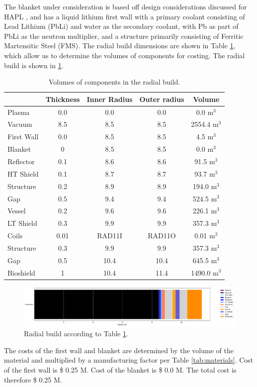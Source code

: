 The blanket under consideration is based off design considerations discussed for HAPL \cite{Raffray2006}, and has a liquid lithium first wall with a primary coolant consisting of Lead Lithium (PbLi) and water as the secondary coolant, with Pb as part of PbLi as the neutron multiplier, and a structure primarily consisting of Ferritic Martensitic Steel (FMS). The radial build dimensions are shown in Table \ref{tab:volumes}, which allow us to determine the volumes of components for costing.  The radial build is shown in \ref{fig:radial}.  \\


\begin{table}[h!]
    \centering
    \begin{tabular}{l c  c c c}
    \hline
        &	Thickness	&	Inner Radius	&	Outer radius	&	Volume		\\
        \hline
Plasma	&	0.0	&	0.0	&	0.0	&	0.0	m$^{3}$	\\
Vacuum	&	8.5	&	8.5	&	8.5	&	2554.4	m$^{3}$	\\
First Wall	&	0.0	&	8.5	&	8.5	&	4.5	m$^{3}$	\\
Blanket	&	0	&	8.5	&	8.5	&	0.0	m$^{3}$	\\
Reflector	&	0.1	&	8.6	&	8.6	&	91.5	m$^{3}$	\\
HT Shield	&	0.1	&	8.7	&	8.7	&	93.7	m$^{3}$	\\
Structure	&	0.2	&	8.9	&	8.9	&	194.0	m$^{3}$	\\
Gap	&	0.5	&	9.4	&	9.4	&	524.5	m$^{3}$	\\
Vessel	&	0.2	&	9.6	&	9.6	&	226.1	m$^{3}$	\\
LT Shield	&	0.3	&	9.9	&	9.9	&	357.3	m$^{3}$	\\
Coils	&	0.01	&	RAD11I	&	RAD11O	&	0.01	m$^{3}$	\\
Structure	&	0.3	&	9.9	&	9.9	&	357.3	m$^{3}$	\\
Gap	&	0.5	&	10.4	&	10.4	&	645.5	m$^{3}$	\\
Bioshield	&	1	&	10.4	&	11.4	&	1490.0	m$^{3}$	\\

        \hline
    \end{tabular}
    \caption{Volumes of components in the radial build.}
    \label{tab:volumes}
\end{table}

\begin{figure}
    \centering
    \includegraphics[width=0.9\linewidth]{Figures/radial_build.pdf}
    \caption{Radial build according to Table \ref{tab:volumes}.}
    \label{fig:radial}
\end{figure}



The costs of the first wall and blanket are determined by the volume of the material and multiplied by a manufacturing factor per Table \ref{tab:materials}.   Cost of the first wall is \$ 0.25 M.  Cost of the blanket is \$ 0.0 M. The total cost is therefore \$ 0.25 M.

